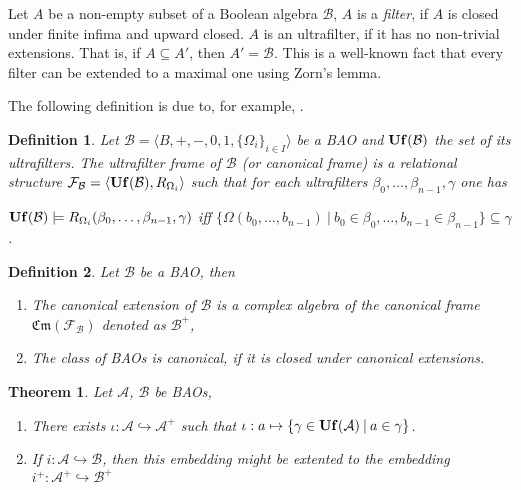 \documentclass[a4paper]{article}
\theoremstyle{defin}
\newtheorem{defin}{Definition}
\theoremstyle{theorem}
\newtheorem{theorem}{Theorem}
\theoremstyle{prop}
\theoremstyle{lemma}
\theoremstyle{fact}
\theoremstyle{ex}
\theoremstyle{col}
\begin{document}
Let $A$ be a non-empty subset of a Boolean algebra $\mathcal{B}$, $A$ is a \emph{filter}, if $A$ is closed under finite infima and upward closed. $A$ is an ultrafilter, if it has no non-trivial extensions. That is, if $A \subseteq A'$, then $A' = \mathcal{B}$. This is a well-known fact that every filter can be extended to a maximal one using Zorn's lemma.

The following definition is due to, for example, \cite[Definition 5.40]{venema2010}.

\begin{defin}
  Let $\mathcal{B} = \langle B, +, -, 0, 1, \{ \Omega_i \}_{i \in I} \rangle$ be a BAO and ${\bf Uf}(\mathcal{B})$ the set of its ultrafilters. The ultrafilter frame of $\mathcal{B}$ (or canonical frame) is a relational structure $\mathcal{F}_{\mathcal{B}} = \langle {\bf Uf}(\mathcal{B}), R_{\Omega_i} \rangle$ such that for each ultrafilters $\beta_0, \dots, \beta_{n - 1}, \gamma$ one has
  \begin{center}
    ${\bf Uf}(\mathcal{B}) \models R_{\Omega_i}(\beta_0, \dots, \beta_{n - 1}, \gamma)$ iff $\{ \Omega(b_0, \dots, b_{n - 1}) \: | \: b_0 \in \beta_0, \dots, b_{n - 1} \in \beta_{n - 1}\} \subseteq \gamma$.
  \end{center}
\end{defin}

\begin{defin} Let $\mathcal{B}$ be a BAO, then

  \begin{enumerate}
    \item The canonical extension of $\mathcal{B}$ is a complex algebra of the canonical frame $\mathfrak{Cm}(\mathcal{F}_{\mathcal{B}})$ denoted as $\mathcal{B}^{+}$,
    \item The class of BAOs is canonical, if it is closed under canonical extensions.
  \end{enumerate}
\end{defin}

\begin{theorem} Let $\mathcal{A}$, $\mathcal{B}$ be BAOs,

\begin{enumerate}
  \item There exists $\iota : \mathcal{A} \hookrightarrow \mathcal{A}^{+}$ such that
  $\iota : a \mapsto \{ \gamma \in {\bf Uf}(\mathcal{A}) \: | \: a \in \gamma \}$.
  \item If $i : \mathcal{A} \hookrightarrow \mathcal{B}$, then this embedding might be extented to the embedding
  $i^{+} : \mathcal{A}^{+} \hookrightarrow \mathcal{B}^{+}$
\end{enumerate}
\end{theorem}
\end{document}
